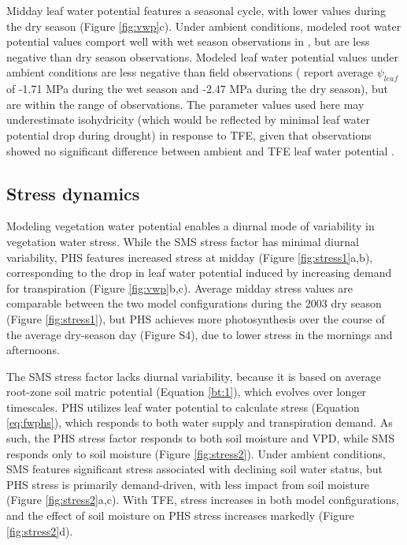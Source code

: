 \documentclass[draft,linenumbers]{agujournal}
\begin{document}
    Midday leaf water potential features a seasonal cycle, with lower values during the dry season (Figure \ref{fig:vwp}c).
    Under ambient conditions, modeled root water potential values comport well with wet season observations in \cite{fisher2006}, but are less negative than dry season observations.
    Modeled leaf water potential values under ambient conditions are less negative than field observations (\cite{fisher2006} report average $\psi_{leaf}$ of -1.71 MPa during the wet season and -2.47 MPa during the dry season), 
    but are within the range of observations.
    The parameter values used here may underestimate isohydricity (which would be reflected by minimal leaf water potential drop during drought) in response to TFE, given that observations showed no significant difference between ambient and TFE leaf water potential \citep{fisher2006}. 

\subsection{Stress dynamics}
    
    Modeling vegetation water potential enables a diurnal mode of variability in vegetation water stress.
    While the SMS stress factor has minimal diurnal variability,
    PHS features increased stress at midday (Figure \ref{fig:stress1}a,b), corresponding to the drop in leaf water potential induced by increasing demand for transpiration (Figure \ref{fig:vwp}b,c).
    Average midday stress values are comparable between the two model configurations during the 2003 dry season (Figure \ref{fig:stress1}), 
    but PHS achieves more photosynthesis over the course of the average dry-season day (Figure S4), due to lower stress in the mornings and afternoons.
    
    The SMS stress factor lacks diurnal variability, because it is based on average root-zone soil matric potential (Equation \ref{bt:1}), which evolves over longer timescales.
    PHS utilizes leaf water potential to calculate stress (Equation \ref{eq:fwphs}), which responds to both water supply and transpiration demand.
    As such, the PHS stress factor responds to both soil moisture and VPD, while SMS responds only to soil moisture (Figure \ref{fig:stress2}).
    Under ambient conditions, SMS features significant stress associated with declining soil water status, but PHS stress is primarily demand-driven, with less impact from soil moisture (Figure \ref{fig:stress2}a,c).
    With TFE, stress increases in both model configurations, and the effect of soil moisture on PHS stress increases markedly (Figure \ref{fig:stress2}d).
\end{document}
